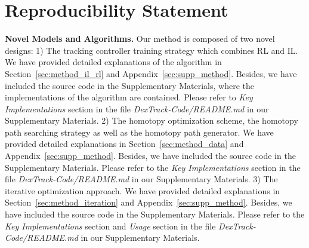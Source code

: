 \section{Reproducibility Statement}

\noindent \textbf{Novel Models and Algorithms.}
Our method is composed of two novel designs: 
1) The tracking controller training strategy which combines RL and IL. We have provided detailed explanations of the algorithm in Section~\ref{sec:method_il_rl} and Appendix~\ref{sec:supp_method}. Besides, we have included the source code in the Supplementary Materials, where the implementations of the algorithm are contained. Please refer to \emph{Key Implementations} section in the file \emph{DexTrack-Code/README.md} in our Supplementary Materials. 
2) The homotopy optimization scheme, the homotopy path searching strategy as well as the homotopy path generator. 
We have provided detailed explanations in Section~\ref{sec:method_data} and Appendix~\ref{sec:supp_method}. Besides, we have included the source code in the Supplementary Materials. Please refer to the \emph{Key Implementations} section in the file \emph{DexTrack-Code/README.md} in our Supplementary Materials. 
3) The iterative optimization approach. We have provided detailed explanations in Section~\ref{sec:method_iteration} and Appendix~\ref{sec:supp_method}.  Besides, we have included the source code in the Supplementary Materials. Please refer to the \emph{Key Implementations} section and \emph{Usage} section in the file \emph{DexTrack-Code/README.md} in our Supplementary Materials. 

